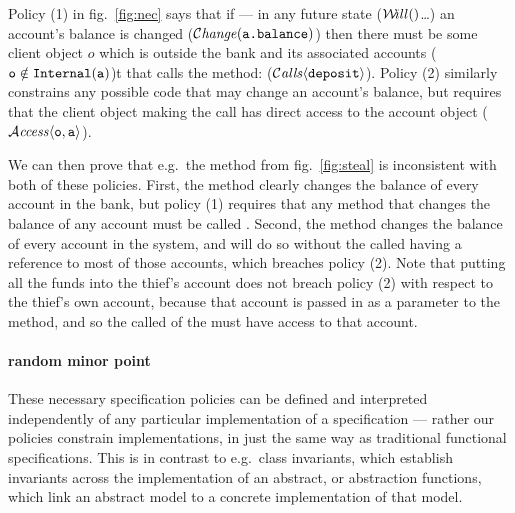 Policy (1) in fig.~\ref{fig:nec} says that if --- in any future state
($\Future$\ldots) an account's balance is changed
($\mathcal{C}\textrm{\textit{hange}}({\mbox{\tt{a.balance}}})$)
then there must be some client object $o$ which is outside the
bank and its associated accounts (${\mbox{\tt{o}}} \notin{\mbox{\tt{Internal}}}({\mbox{\tt{a}}})$)t
that calls the  method: (${\mathcal{C}}\textrm{\textit{alls}}\langle {\mbox{\tt{deposit}}}\rangle$).
Policy (2) similarly constrains any possible code that may change an
account's balance, but requires that the client object making the call
has direct access to the account object
(${\mathcal{A}}\textrm{\textit{ccess}}\langle {\mbox{\tt{o}}},{\mbox{\tt{a}}}\rangle$).


We can then prove that e.g.\ the  method from
fig.~\ref{fig:steal} is inconsistent with both of these policies.
First, the  method clearly changes the balance of
every account in the bank, but policy (1) requires that any method
that changes the balance of any account must be called .
Second, the  method changes the balance of every account in
the system, and will do so without the called having a reference to
most of those accounts, which breaches policy (2).   Note
that  putting all the funds into the thief's account
does not breach policy (2) with respect to the thief's own account,
because that account is passed in as a parameter to the 
method, and so the called of the  must have access to that
account.


\paragraph{random minor point}

These necessary specification policies
can be defined and interpreted independently of any particular
implementation of a specification --- rather our policies constrain
implementations, in just the same way as traditional functional
specifications.  This is in contrast to e.g.\ class invariants, which
establish invariants across the implementation of an abstract, or
abstraction functions, which link an abstract model to a concrete
implementation of that model. 
